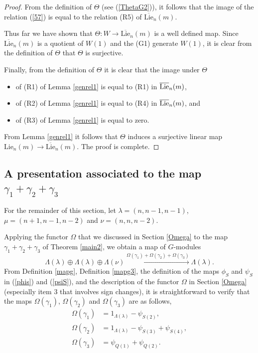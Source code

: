 \documentclass[11pt]{amsart}
\theoremstyle{definition}
\numberwithin{equation}{section}
\begin{document}
\begin{proof}
	From the definition of $\Theta$ (see (\ref{ThetaG2})), it follows that the image of the relation (\ref{57}) is equal to the relation (R5) of $\overline{\text{Lie}}_n(m)$. 
	
	Thus far we have shown that $\Theta:W \to \overline{\text{Lie}}_n(m)$ is a well defined map. Since $\overline{\text{Lie}}_n(m)$ is a quotient of $W(1)$ and the (G1) generate $W(1)$, it is clear from the definition of $\Theta$ that $\Theta$ is surjective.
	
	Finally, from the definition of $\Theta$ it is clear that the image under $\Theta$
	\begin{itemize}
		\item of (R1) of Lemma \ref{genrel1} is equal to (R1) in $\overline{\textup{Lie}}_n(m)$,
		\item of (R2) of Lemma \ref{genrel1} is equal to (R4) in $\overline{\textup{Lie}}_n(m)$, and
		\item of (R3) of Lemma \ref{genrel1} is equal to zero.
	\end{itemize}
From Lemma \ref{genrel1} it follows that $\Theta$ induces a surjective linear map $\text{Lie}_n(m) \to \overline{\text{Lie}}_n(m)$. The proof is complete.
	
	

	
 	\end{proof}
\subsection{A presentation associated to the map $\gamma_1+\gamma_2 +\gamma_3$}
For the remainder of this section, let $\lambda=(n,n-1,n-1)$, $\mu=(n+1,n-1,n-2)$ and $\nu=(n,n,n-2)$.

Applying the functor $\Omega$ that we discussed in Section \ref{Omega} to the map $\gamma_1 +\gamma_2 + \gamma_3$ of Theorem \ref{main2}, we obtain a map of $G$-modules
\begin{equation}\label{omegaonmaps}
	\Lambda(\lambda) \oplus \Lambda(\lambda) \oplus  \Lambda(\nu) \xrightarrow{\Omega(\gamma_1) + \Omega(\gamma_2)+ \Omega(\gamma_3)} \Lambda(\lambda).
\end{equation}
From Definition \ref{mapg}, Definition \ref{mapg3}, the definition of the maps $\phi_S$ and $\psi_S$ in (\ref{phis}) and (\ref{psiS}), and the description of the functor $\Omega$ in Section \ref{Omega} (especially item 3 that involves sign changes), it is straightforward to verify that the maps $\Omega(\gamma_1)$, $\Omega(\gamma_2)$ and  $\Omega(\gamma_3)$ are as follows,
\begin{align*}
	\Omega(\gamma_1)&=1_{\Lambda(\lambda)}-\psi_{S(2)},\\
	\Omega(\gamma_2)&=1_{\Lambda(\lambda)}-\psi_{S(3)}+\psi_{S(4)},\\
	\Omega(\gamma_3)&=\psi_{Q(1)} + \psi_{Q(2)}.
\end{align*}
\end{document}
